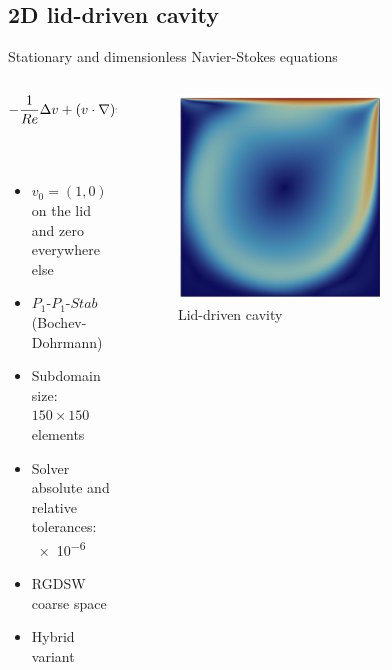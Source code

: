 \subsection{2D lid-driven cavity}

\begin{frame}{Stationary and dimensionless Navier-Stokes equations}
  \vspace{-5mm}
	\begin{columns}
		\begin{column}{0.6\textwidth}%
			\begin{align*}
				-\frac{1}{Re} \Delta v + (v \cdot \nabla)v + \nabla p & = 0 \;   & {\rm in}\; \Omega           \\
				{\rm div}(v)                                          & = 0 \;   & {\rm in} \; \Omega          \\
				v                                                     & = v_0 \; & {\rm on} \; \partial \Omega
			\end{align*}
  \vspace{-4mm}
			\begin{itemize}
				\item $v_0=(1,0)$ on the lid and zero everywhere else
        \item $P_1\textrm{-}P_1\textrm{-}Stab$ (Bochev-Dohrmann) \footnotemark{}
				\item Subdomain size: $150\times 150$ elements
				\item Solver absolute and relative tolerances: \num{e-6}
        \item RGDSW coarse space \footnotemark{}
				\item Hybrid variant
			\end{itemize}
		\end{column}
		\begin{column}{0.4\textwidth}
			\begin{figure}
				\centering
				\includegraphics[width=0.7\textwidth]{images/ldc.png}
				\caption{Lid-driven cavity}
			\end{figure}
		\end{column}
	\end{columns}
\end{frame}

